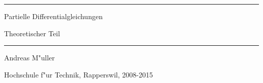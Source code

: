 \documentclass[a4paper,12pt]{book}
\begin{document}
\pagestyle{fancy}
\lhead{}
\rhead{}
\frontmatter
\newcommand\HRule{\noindent\rule{\linewidth}{1.5pt}}
\begin{titlepage}
\HRule
\vspace*{10pt}
\begin{flushright}
{\Huge
Partielle Differentialgleichungen}
\end{flushright}
\begin{flushright}
{\Large Theoretischer Teil}
\end{flushright}
\HRule
\begin{flushright}
\vspace{30pt}
\LARGE
Andreas M"uller
\end{flushright}
\begin{center}
Hochschule f"ur Technik, Rapperswil, 2008-2015
\end{center}
\end{titlepage}
\hypersetup{
    colorlinks=true,
    linktoc=all,
    linkcolor=blue
}
\tableofcontents
\newtheorem{satz}{Satz}[chapter]
\newtheorem{problem}[satz]{Problem}
\newtheorem{hilfssatz}[satz]{Hilfssatz}
\newtheorem{definition}[satz]{Definition}
\newtheorem{annahme}[satz]{Annahme}
\newtheorem{aufgabe}[satz]{Aufgabe}
\newenvironment{beispiel}[1][Beispiel]{%
\begin{proof}[#1]%
\renewcommand{\qedsymbol}{$\bigcirc$}
}{\end{proof}}
\mainmatter












%

\end{document}
